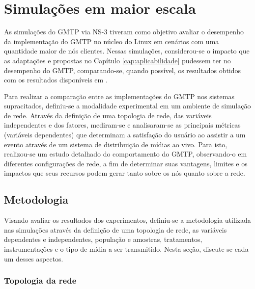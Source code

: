 
\section{Simulações em maior escala}
\label{sec:simulaoes-ns3}

As simulações do GMTP via NS-3 tiveram como objetivo avaliar o desempenho da implementação do GMTP no núcleo do Linux em cenários com uma quantidade maior de nós clientes. Nessas simulações, considerou-se o impacto que as adaptações e propostas no Capítulo \ref{cap:aplicabilidade} pudessem ter no desempenho do GMTP, comparando-se, quando possível, os resultados obtidos com os resultados disponíveis em \cite{sales2014gmtp}.

Para realizar a comparação entre as implementações do GMTP nos sistemas supracitados, definiu-se a modalidade experimental em um ambiente de simulação de rede. 
Através da definição de uma topologia de rede, das variáveis independentes e dos fatores, mediram-se e analisaram-se as principais métricas (variáveis dependentes) que determinam a satisfação do usuário ao assistir a um evento através de um sistema de distribuição de mídias ao vivo.
Para isto, realizou-se um estudo detalhado do comportamento do GMTP, observando-o em diferentes configurações de rede, a fim de determinar suas vantagens, limites e os impactos que seus recursos podem gerar tanto sobre os nós quanto sobre a rede.

\subsection{Metodologia}
\label{subsec:metodologia-ns3}

Visando avaliar os resultados dos experimentos, definiu-se a metodologia utilizada nas simulações através da definição de uma topologia de rede, as variáveis dependentes e independentes, população e amostras, tratamentos, instrumentações e o tipo de mídia a ser transmitido. Nesta seção, discute-se cada um desses aspectos.

\subsubsection{Topologia da rede}

